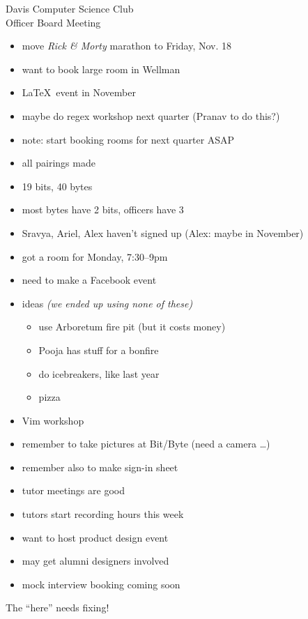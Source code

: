 \documentclass{article}
\begin{document}
\begin{Minutes}{Davis Computer Science Club\\Officer Board Meeting}
\begin{itemize}
\item move \textit{Rick \& Morty} marathon to Friday, Nov. 18
\item want to book large room in Wellman
\item \LaTeX\ event in November
\item maybe do regex workshop next quarter (Pranav to do this?)
\item note: start booking rooms for next quarter ASAP
\end{itemize}

\begin{itemize}
\item all pairings made
\item 19 bits, 40 bytes
\item most bytes have 2 bits, officers have 3
\item Sravya, Ariel, Alex haven't signed up (Alex: maybe in November)
\item got a room for Monday, 7:30--9pm
\item need to make a Facebook event
\item ideas \textit{(we ended up using none of these)}
  \begin{itemize}
  \item use Arboretum fire pit (but it costs money)
  \item Pooja has stuff for a bonfire
  \item do icebreakers, like last year
  \item pizza
  \end{itemize}
\end{itemize}

\begin{itemize}
\item Vim workshop
\item remember to take pictures at Bit/Byte (need a camera \dots)
\item remember also to make sign-in sheet
\end{itemize}

\begin{itemize}
\item tutor meetings are good
\item tutors start recording hours this week
\end{itemize}

\begin{itemize}
\item want to host product design event
\item may get alumni designers involved
\item mock interview booking coming soon
\end{itemize}

\vfill
\centerline{\huge The ``here'' needs fixing!}
\vfill
\vfill
\thispagestyle{creditfooter}
\end{Minutes}
\end{document}
